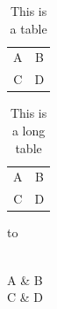 \documentclass{article}
\begin{document}
\begin{table}[!h]
\caption{This is a table}
\centering
\begin{tabular}{cc}
A & B \\
C & D \\
\end{tabular}
\end{table}

\begin{longtable}{cc}
\caption{This is a long table}\\
A & B \\
C & D \\
\end{longtable}

\begin{longtabu} to \textwidth {
    X[15,l]
    X[4,l]
    }
    \caption{This is a long tabu table}\\
    A & B \\
    C & D \\
\end{longtabu}
\end{document}
